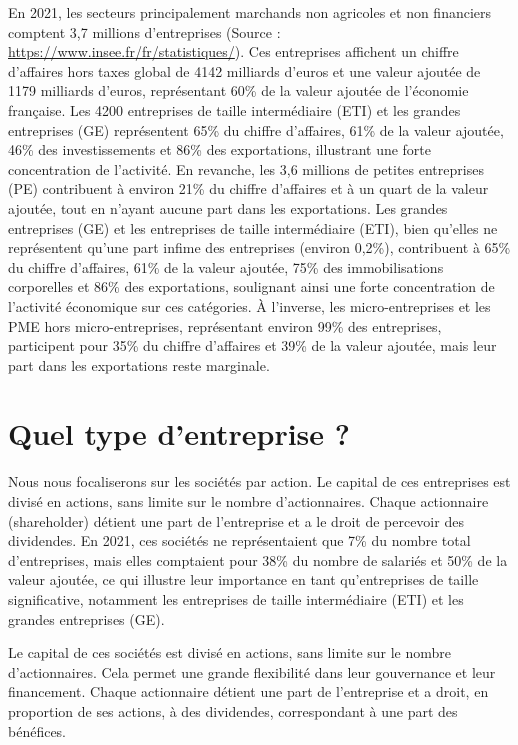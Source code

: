 \documentclass[a4paper, 12pt]{report}
\begin{document}
En 2021, les secteurs principalement marchands non agricoles et non financiers comptent 3,7 millions d'entreprises (Source : \url{https://www.insee.fr/fr/statistiques/}). Ces entreprises affichent un chiffre d'affaires hors taxes global de 4142 milliards d'euros et une valeur ajoutée de 1179 milliards d'euros, représentant 60\% de la valeur ajoutée de l'économie française. Les 4200 entreprises de taille intermédiaire (ETI) et les grandes entreprises (GE) représentent 65\% du chiffre d'affaires, 61\% de la valeur ajoutée, 46\% des investissements et 86\% des exportations, illustrant une forte concentration de l'activité. En revanche, les 3,6 millions de petites entreprises (PE) contribuent à environ 21\% du chiffre d'affaires et à un quart de la valeur ajoutée, tout en n'ayant aucune part dans les exportations. Les grandes entreprises (GE) et les entreprises de taille intermédiaire (ETI), bien qu'elles ne représentent qu'une part infime des entreprises (environ 0,2\%), contribuent à 65\% du chiffre d'affaires, 61\% de la valeur ajoutée, 75\% des immobilisations corporelles et 86\% des exportations, soulignant ainsi une forte concentration de l'activité économique sur ces catégories. À l'inverse, les micro-entreprises et les PME hors micro-entreprises, représentant environ 99\% des entreprises, participent pour 35\% du chiffre d'affaires et 39\% de la valeur ajoutée, mais leur part dans les exportations reste marginale.

\section{Quel type d’entreprise ?}
	
Nous nous focaliserons sur les sociétés par action. Le capital de ces entreprises est divisé en actions, sans limite sur le nombre d'actionnaires. Chaque actionnaire (shareholder) détient une part de l'entreprise et a le droit de percevoir des dividendes. En 2021, ces sociétés ne représentaient que 7\% du nombre total d'entreprises, mais elles comptaient pour 38\% du nombre de salariés et 50\% de la valeur ajoutée, ce qui illustre leur importance en tant qu'entreprises de taille significative, notamment les entreprises de taille intermédiaire (ETI) et les grandes entreprises (GE).

Le capital de ces sociétés est divisé en actions, sans limite sur le nombre d'actionnaires. Cela permet une grande flexibilité dans leur gouvernance et leur financement. Chaque actionnaire détient une part de l'entreprise et a droit, en proportion de ses actions, à des dividendes, correspondant à une part des bénéfices.
\end{document}
